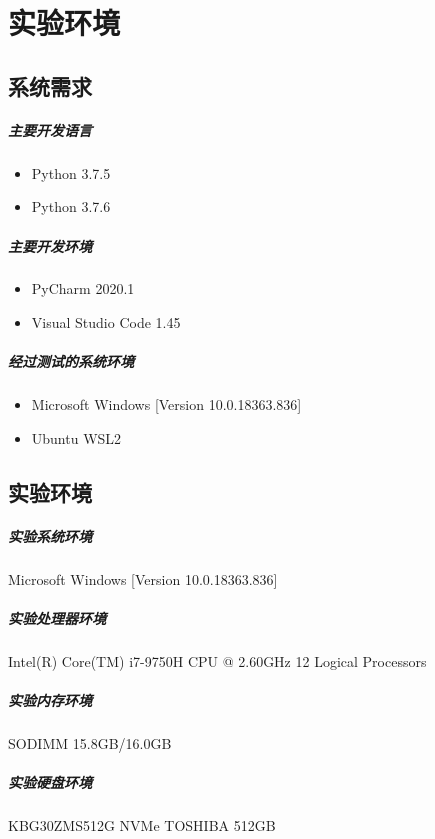 \documentclass[UTF8]{ctexrep} %
\begin{document}
\chapter{实验环境}
\section{系统需求}
\paragraph{主要开发语言}
\begin{itemize}
    \item Python 3.7.5
    \item Python 3.7.6
\end{itemize}
\paragraph{主要开发环境}
\begin{itemize}
    \item PyCharm 2020.1
    \item Visual Studio Code 1.45
\end{itemize}
\paragraph{经过测试的系统环境}
\begin{itemize}
    \item Microsoft Windows [Version 10.0.18363.836]
    \item Ubuntu WSL2
\end{itemize}

\section{实验环境}
\paragraph{实验系统环境} Microsoft Windows [Version 10.0.18363.836]
\paragraph{实验处理器环境} Intel(R) Core(TM) i7-9750H CPU @ 2.60GHz 12 Logical Processors
\paragraph{实验内存环境} SODIMM 15.8GB/16.0GB
\paragraph{实验硬盘环境} KBG30ZMS512G NVMe TOSHIBA 512GB
\end{document}
